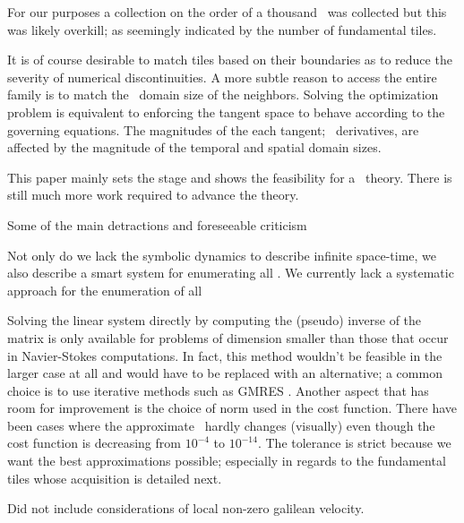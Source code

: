 \begin{itemize}
{%

For our purposes a collection on the order of a thousand \twots\
was collected but this was likely overkill; as seemingly indicated by the number
of fundamental tiles.

It is of course desirable to match tiles based on their boundaries as to reduce the severity of numerical
discontinuities. A more subtle reason to access the entire family is to match the
\spt\ domain size of the neighbors. Solving the optimization problem is equivalent
to enforcing the tangent space to behave according to the governing equations.
The magnitudes of the each tangent; \spt\ derivatives, are affected by the magnitude
of the temporal and spatial domain sizes.

This paper mainly sets the stage and shows the feasibility for a \spt\ theory. There
is still much more work required to advance the theory.

Some of the main detractions and foreseeable criticism



Not only do we lack the symbolic
dynamics to describe infinite space-time, we also describe a smart system for enumerating all
\twots.
We currently lack a systematic approach for the enumeration of all


\item[Criticisms of these methods]
Solving the linear system directly by computing the (pseudo) inverse
of the matrix
is only available for problems of dimension smaller than those that
occur in Navier-Stokes
computations. In fact, this method wouldn't be feasible in the larger
case at all and
would have to be replaced with an alternative; a common choice is to
use iterative
methods such as GMRES . Another aspect that has room for
improvement is
the choice of norm used in the cost function. There have been cases
where the
approximate \twot\ hardly changes (visually) even though the cost
 function is
decreasing from $10^{-4}$ to $10^{-14}$. The tolerance is strict
because we want
the best approximations possible; especially in regards to the
fundamental tiles
whose acquisition is detailed next.

Did not include considerations of local non-zero galilean velocity.

}
\end{itemize}
